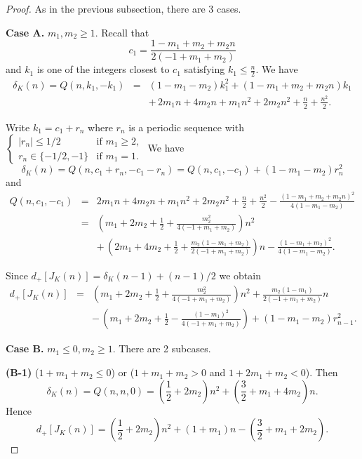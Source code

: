 \documentclass[11pt]{amsart}
\numberwithin{equation}{section}
\theoremstyle{plain}
\theoremstyle{definition}
\begin{document}
\begin{proof} As in the previous subsection, there are 3 cases.

\vskip 0.04in

\textbf{Case A.} $m_1, m_2 \ge 1$. Recall that $$c_1=\frac{1 - m_1 + m_2 + m_2 n}{2 (-1 + m_1 + m_2)}$$ 
and $k_1$ is one of the integers closest to $c_1$ satisfying $k_1 \le \frac{n}{2}$. We have
\begin{eqnarray*}
\delta_K(n) = Q(n,k_1,-k_1)
&=& (1-m_1-m_2) k_1^2 + ( 1 - m_1 + m_2 + m_2 n) k_1 \\
&& + \, 2 m_1 n + 4 m_2 n  + m_1 n^2 + 2 m_2 n^2 + \frac{n}{2} + \frac{n^2}{2}.
\end{eqnarray*}

Write $k_1 = c_1 + r_n$ where $r_n$ is a periodic sequence with $\begin{cases} |r_n| \le 1/2 &\mbox{if } m_1 \ge 2, 
\\ r_n \in \{-1/2, -1\}  & \mbox{if } m_1 = 1. 
\end{cases}$ We have
$$
\delta_K(n) = Q(n,c_1+r_n,-c_1-r_n) = Q(n,c_1,-c_1) + (1-m_1-m_2) r_n^2
$$
and
\begin{eqnarray*}
Q(n,c_1,-c_1) &=& 2 m_1 n + 4 m_2 n  + m_1 n^2 + 2 m_2 n^2 + \frac{n}{2} + \frac{n^2}{2} -\frac{( 1 - m_1 + m_2 + m_2 n)^2}{4(1-m_1-m_2)} \\
&=& \left( m_1 + 2m_2 + \frac{1}{2} + \frac{m_2^2}{4(-1 + m_1 + m_2)} \right) n^2 \\
&& + \,  \left( 2m_1 + 4m_2 + \frac{1}{2} + \frac{m_2(1-m_1+m_2)}{2(-1 + m_1 + m_2)} \right) n - \frac{( 1 - m_1 + m_2)^2}{4(1-m_1-m_2)}.
\end{eqnarray*} 

Since $d_+[J_K(n)] = \delta_K(n-1) + (n-1)/2$ we obtain
\begin{eqnarray*}
d_+[J_K(n)] &=& \left( m_1 + 2m_2 + \frac{1}{2} + \frac{m_2^2}{4(-1 + m_1 + m_2)} \right) n^2 + \frac{m_2(1-m_1)}{2(-1+m_1+m_2)} n\\
&& - \, \left( m_1 + 2m_2 + \frac{1}{2} - \frac{(1-m_1)^2}{4(-1 + m_1 + m_2)} \right) + (1-m_1-m_2) r^2_{n-1}.
\end{eqnarray*} 

\textbf{Case B.} $m_1 \le 0, m_2 \ge 1$.  There are 2 subcases.

\textbf{(B-1)} ($1 + m_1 + m_2 \le 0$) or ($1 + m_1 + m_2 > 0$ and $1 + 2m_1 + m_2 < 0$). Then
$$\delta_K(n) = Q(n,n,0)=\left( \frac{1}{2} + 2 m_2 \right) n^2 + \left( \frac{3}{2} + m_1 + 4 m_2 \right) n.$$
Hence $$
d_+[J_K(n)] = \left( \frac{1}{2} + 2 m_2 \right) n^2 + (1 + m_1) n - \left( \frac{3}{2} + m_1 + 2 m_2 \right).
$$


\end{proof}
\end{document}

